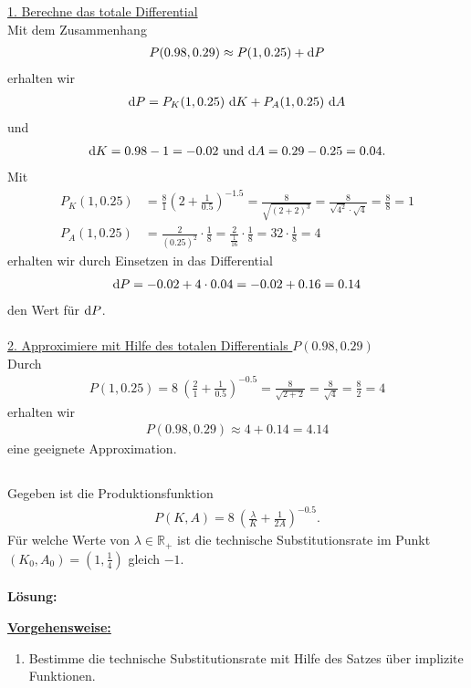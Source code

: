 \underline{1. Berechne das totale Differential}\\
Mit dem Zusammenhang
\begin{align*}
P(0.98,0.29) \approx  P(1,0.25) + \text{\rmfamily d} P
\end{align*}
erhalten wir 
\begin{align*}
\text{\rmfamily d} P = P_K(1,0.25) \ \text{\rmfamily d} K + P_A(1,0.25)  \ \text{\rmfamily d} A 
\end{align*}
und
\begin{align*}
\text{\rmfamily d} K = 0.98 - 1 = -0.02
\ \text{und} \
\text{\rmfamily d} A = 0.29 - 0.25 = 0.04. 
\end{align*}
Mit 
\begin{align*}
P_K(1,0.25) &= 
\frac{8}{1} \left( 2 + \frac{1}{0.5} \right)^{-1.5}
= \frac{8}{\sqrt{(2 +2)^3}}
= \frac{8}{\sqrt{4^2} \cdot \sqrt{4}}
= \frac{8}{8}
= 1
\\
P_A(1,0.25)
&= \frac{2}{(0.25)^2} \cdot \frac{1}{8}
= \frac{2}{\frac{1}{16}} \cdot \frac{1}{8} 
= 32 \cdot \frac{1}{8} = 4
\end{align*}
erhalten wir durch Einsetzen in das Differential
\begin{align*}
\text{\rmfamily d} P = - 0.02 + 4 \cdot 0.04
= -0.02 + 0.16 = 0.14
\end{align*}
den Wert für $\text{\rmfamily d} P$.\\
\\

\underline{2. Approximiere mit Hilfe des totalen Differentials $P(0.98,0.29)$ }\\
Durch 
\begin{align*}
P(1,0.25) =
8 \ \left( \frac{2}{1} +\frac{1}{0.5} \right)^{-0.5}
=
\frac{8}{\sqrt{2 + 2}}
=
\frac{8}{\sqrt{4}}
=
\frac{8}{2}
=
4
\end{align*}
erhalten wir
\begin{align*}
P(0.98,0.29) \approx 4 + 0.14 = 4.14
\end{align*}
eine geeignete Approximation.


\newpage

\subsection*{}
Gegeben ist die Produktionsfunktion
\begin{align*}
P(K,A)= 
8 \ \left( \frac{\lambda}{K} +\frac{1}{2A} \right)^{-0.5}.
\end{align*}
Für welche Werte von $\lambda \in \mathbb{R}_+$ ist die technische Substitutionsrate im Punkt $(K_0,A_0) = \left( 1, \frac{1}{4} \right)$ gleich $-1$.
\\
\\ 
\textbf{Lösung:}
\begin{mdframed}
\underline{\textbf{Vorgehensweise:}}
\begin{enumerate}
\item Bestimme die technische Substitutionsrate mit Hilfe des Satzes über implizite Funktionen.
\end{enumerate}
\end{mdframed}

